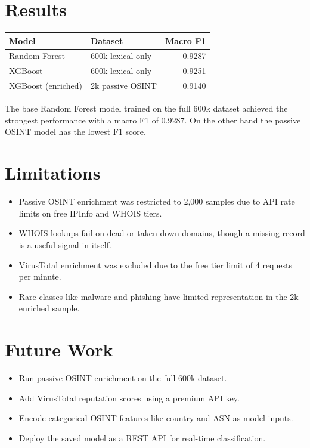 \documentclass[11pt,a4paper]{article}
\begin{document}
\newpage
\section{Results}

\begin{table}[h]
\centering
\begin{tabular}{l l r}
\toprule
\textbf{Model} & \textbf{Dataset} & \textbf{Macro F1} \\
\midrule
Random Forest & 600k lexical only & 0.9287 \\
XGBoost & 600k lexical only & 0.9251 \\
XGBoost (enriched) & 2k passive OSINT & 0.9140 \\
\bottomrule
\end{tabular}
\end{table}

The base Random Forest model trained on the full 600k dataset achieved 
the strongest performance with a macro F1 of 0.9287. On the other hand the passive OSINT model has the 
lowest F1 score.

\section{Limitations}
\begin{itemize}
    \item Passive OSINT enrichment was restricted to 2,000 samples due to API rate limits on free IPInfo and WHOIS tiers.
    \item WHOIS lookups fail on dead or taken-down domains, though a missing record is a useful signal in itself.
    \item VirusTotal enrichment was excluded due to the free tier limit of 4 requests per minute.
    \item Rare classes like malware and phishing have limited representation in the 2k enriched sample.
\end{itemize}

\section{Future Work}
\begin{itemize}
    \item Run passive OSINT enrichment on the full 600k dataset.
    \item Add VirusTotal reputation scores using a premium API key.
    \item Encode categorical OSINT features like country and ASN as model inputs.
    \item Deploy the saved model as a REST API for real-time classification.
\end{itemize}
\end{document}
